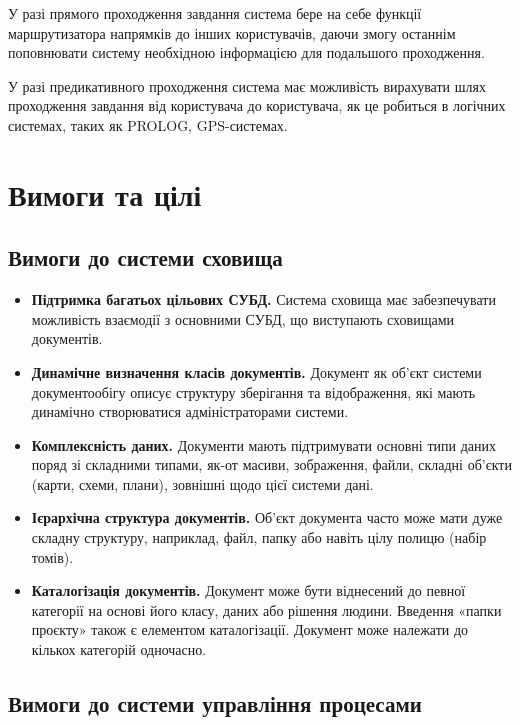 \documentclass{memoir}
\begin{document}
У разі прямого проходження завдання система бере на себе функції маршрутизатора напрямків до інших користувачів, даючи змогу останнім поповнювати систему необхідною інформацією для подальшого проходження.

У разі предикативного проходження система має можливість вирахувати шлях проходження завдання від користувача до користувача, як це робиться в логічних системах, таких як PROLOG, GPS-системах.

\section{Вимоги та цілі}

\subsection{Вимоги до системи сховища}

\begin{itemize}
    \item \textbf{Підтримка багатьох цільових СУБД.} Система сховища має забезпечувати можливість взаємодії з основними СУБД, що виступають сховищами документів.
    \item \textbf{Динамічне визначення класів документів.} Документ як об’єкт системи документообігу описує структуру зберігання та відображення, які мають динамічно створюватися адміністраторами системи.
    \item \textbf{Комплексність даних.} Документи мають підтримувати основні типи даних поряд зі складними типами, як-от масиви, зображення, файли, складні об’єкти (карти, схеми, плани), зовнішні щодо цієї системи дані.
    \item \textbf{Ієрархічна структура документів.} Об’єкт документа часто може мати дуже складну структуру, наприклад, файл, папку або навіть цілу полицю (набір томів).
    \item \textbf{Каталогізація документів.} Документ може бути віднесений до певної категорії на основі його класу, даних або рішення людини. Введення «папки проєкту» також є елементом каталогізації. Документ може належати до кількох категорій одночасно.
\end{itemize}

\subsection{Вимоги до системи управління процесами}
\end{document}
